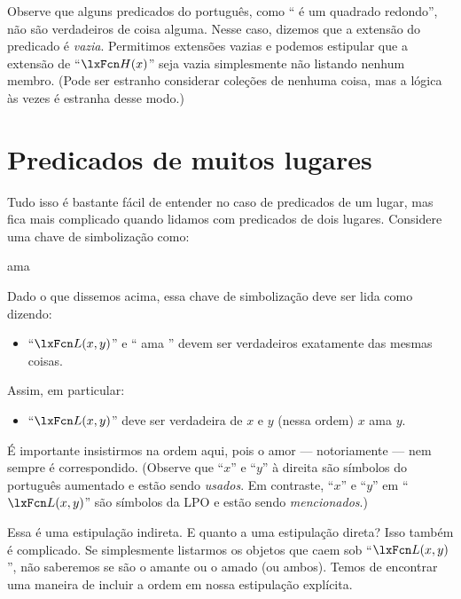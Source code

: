 Observe que alguns predicados do português, como \textquotedblleft {} é um quadrado redondo\textquotedblright{}, não são verdadeiros de coisa alguma. Nesse caso, dizemos que a extensão do predicado é \emph{vazia}. Permitimos extensões vazias e podemos estipular que a extensão de \textquotedblleft $\atom{H}{x}$\textquotedblright{} seja vazia simplesmente não listando nenhum membro. (Pode ser estranho considerar coleções de nenhuma coisa, mas a lógica às vezes é estranha desse modo.)


\section{Predicados de muitos lugares}
Tudo isso é bastante fácil de entender no caso de predicados de um lugar, mas fica mais complicado quando lidamos com predicados de dois lugares. Considere uma chave de simbolização como:
	\begin{ekey}
\item[\atom{L}{x,y}]  ama 
	\end{ekey}
Dado o que dissemos acima, essa chave de simbolização deve ser lida como dizendo:
	\begin{itemize}
\item \textquotedblleft $\atom{L}{x,y}$\textquotedblright{} e \textquotedblleft {} ama \textquotedblright{} devem ser verdadeiros exatamente das mesmas coisas.
	\end{itemize}
Assim, em particular:
	\begin{itemize}
\item \textquotedblleft $\atom{L}{x,y}$\textquotedblright{} deve ser verdadeira de $x$ e $y$ (nessa ordem) \ifeff{} $x$ ama $y$.
	\end{itemize}
É importante insistirmos na ordem aqui, pois o amor — notoriamente — nem sempre é correspondido. (Observe que \textquotedblleft $x$\textquotedblright{} e \textquotedblleft $y$\textquotedblright{} à direita são símbolos do português aumentado e estão sendo \emph{usados}. Em contraste, \textquotedblleft $x$\textquotedblright{} e \textquotedblleft $y$\textquotedblright{} em \textquotedblleft $\atom{L}{x,y}$\textquotedblright{} são símbolos da LPO e estão sendo \emph{mencionados}.)

Essa é uma estipulação indireta. E quanto a uma estipulação direta? Isso também é complicado. Se simplesmente listarmos os objetos que caem sob \textquotedblleft $\atom{L}{x,y}$\textquotedblright{}, não saberemos se são o amante ou o amado (ou ambos). Temos de encontrar uma maneira de incluir a ordem em nossa estipulação explícita.

